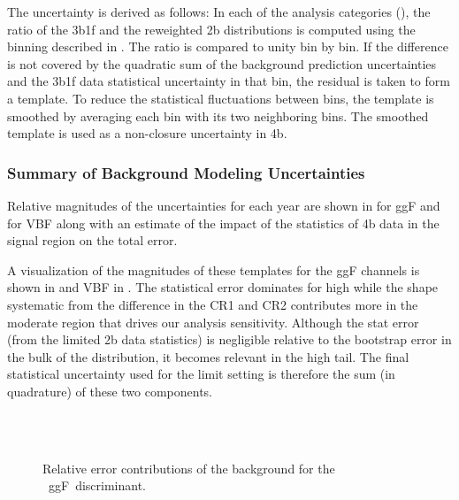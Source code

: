 The uncertainty is derived as follows:
In each of the analysis categories (\Sect{\ref{subsec:cat-motivation}}), the ratio of the 3b1f and the reweighted 2b \mhh distributions is computed using the binning described in \Tab{\ref{tab:binning-hyperparameters}}.
The ratio is compared to unity bin by bin.
If the difference is not covered by the quadratic sum of the background prediction uncertainties and the 3b1f data statistical uncertainty in that bin, the residual is taken to form a template.
To reduce the statistical fluctuations between bins, the template is smoothed by averaging each bin with its two neighboring bins.
The smoothed template is used as a non-closure uncertainty in 4b.

\FloatBarrier
\clearpage
\subsubsection{Summary of Background Modeling Uncertainties}
\label{subsec:bkgUnc-summary}

\def\NNTtag{NR-MAR22-unblind}

Relative magnitudes of the uncertainties for
each year are shown in \Tab{\ref{tbl:ggF-errs-ALL}} for ggF and \Tab{\ref{tbl:VBF-errs-ALL}} for VBF along with an estimate of the impact of the statistics of 4b
data in the signal region on the total error. 




A visualization of the magnitudes of these templates for the ggF channels is shown in \Fig{\ref{fig:bkgRelErr-ggF-4b}} and VBF in .
The statistical error dominates for high \mhh while the shape systematic from the difference in the CR1 and CR2 contributes more in the moderate \mhh region that drives our analysis sensitivity.
Although the stat error (from the limited 2b data statistics) is negligible relative to the bootstrap error in the bulk of the distribution, it becomes relevant in the high \mhh tail. 
The final statistical uncertainty used for the limit setting is therefore the sum (in quadrature) of these two components. 

\def\NNTtag{NR-UNBLIND-FEB22-2}

\begin{figure}[ht]
	\centering
	 \\
	 \\
	\caption{Relative error contributions of the background for the \bcat~ggF~discriminant.}
	\label{fig:bkgRelErr-ggF-4b}
\end{figure}


